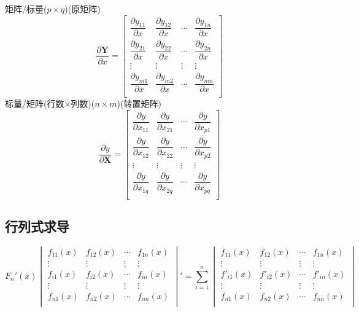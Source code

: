 \documentclass[11pt, a4paper, UTF8]{ctexart}
\begin{document}
矩阵/标量($p\times q$)(原矩阵)\\
\[\dfrac{\partial\bm Y}{\partial x}=
\begin{bmatrix}
\dfrac{\partial y_{11}}{\partial x}&\dfrac{\partial y_{12}}{\partial x}&\cdots&\dfrac{\partial y_{1n}}{\partial x}\\
\dfrac{\partial y_{21}}{\partial x}&\dfrac{\partial y_{22}}{\partial x}&\cdots&\dfrac{\partial y_{2n}}{\partial x}\\
\vdots&\vdots&\vdots&\vdots\\
\dfrac{\partial y_{m1}}{\partial x}&\dfrac{\partial y_{m2}}{\partial x}&\cdots&\dfrac{\partial y_{mn}}{\partial x}\\
\end{bmatrix}
\]
标量/矩阵(行数$\times$列数)($n\times m$)(转置矩阵)\\
\[\dfrac{\partial y}{\partial\bm X}=
\begin{bmatrix}
\dfrac{\partial y}{\partial x_{11}}&\dfrac{\partial y}{\partial x_{21}}&\cdots&\dfrac{\partial y}{\partial x_{p1}}\\
\dfrac{\partial y}{\partial x_{12}}&\dfrac{\partial y}{\partial x_{22}}&\cdots&\dfrac{\partial y}{\partial x_{p2}}\\
\vdots&\vdots&\vdots&\vdots\\
\dfrac{\partial y}{\partial x_{1q}}&\dfrac{\partial y}{\partial x_{2q}}&\cdots&\dfrac{\partial y}{\partial x_{pq}}\\
\end{bmatrix}
\]
\subsection{行列式求导}
\[F_n'(x)
\begin{vmatrix}
f_{11}(x)&f_{12}(x)&\cdots&f_{1n}(x)\\
\vdots&\vdots&\vdots&\vdots\\
f_{i1}(x)&f_{i2}(x)&\cdots&f_{in}(x)\\
\vdots&\vdots&\vdots&\vdots\\
f_{n1}(x)&f_{n2}(x)&\cdots&f_{nn}(x)\\
\end{vmatrix}
'=\sum_{i=1}^n
\begin{vmatrix}
f_{11}(x)&f_{12}(x)&\cdots&f_{1n}(x)\\
\vdots&\vdots&\vdots&\vdots\\
f'_{i1}(x)&f'_{i2}(x)&\cdots&f'_{in}(x)\\
\vdots&\vdots&\vdots&\vdots\\
f_{n1}(x)&f_{n2}(x)&\cdots&f_{nn}(x)\\
\end{vmatrix}
\]
\end{document}
